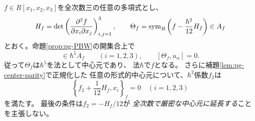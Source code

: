\begin{proposition}[普遍的なCasimirの二次補正]\label{prop:pg-universal-casimir-jet}
$f\in R[x_1,x_2,x_3]$を全次数三の任意の多項式とし、
\begin{equation}
 H_f=\det\left(\frac{\partial^2f}
 {\partial x_i\partial x_j}\right)_{i,j=1}^3,\qquad
 \Theta_f=\operatorname{sym}_R\left(f-\frac{\hbar^2}{12}H_f\right)\in A_f
\end{equation}
とおく。命題\ref{prop:pg-PBW}の開集合上で
\begin{equation}
 [\Theta_f,x_i]\in\hbar^5 A_f\qquad(i=1,2,3),
 \qquad [\Theta_f,u_\alpha]=0.
 \label{eq:pg-casimir-jet}
\end{equation}
従って$\Theta_f$は$\hbar^5$を法として中心元であり、
法$\hbar$で$f$となる。
さらに補題\ref{lem:pg-center-parity}で正規化した
任意の形式的中心元について、$\hbar^2$係数$f_2$は
\begin{equation}
 \left\{f_2+\frac1{12}H_f,x_i\right\}_f=0\quad(i=1,2,3)
 \label{eq:pg-jet-casimir-condition}
\end{equation}
を満たす。
最後の条件は$f_2=-H_f/12$が
\emph{全次数で厳密な中心元に延長する}ことを主張しない。
\end{proposition}
